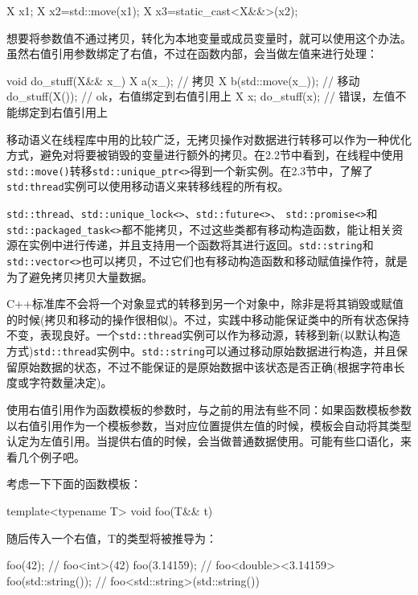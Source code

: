 \begin{cpp}
X x1;
X x2=std::move(x1);
X x3=static_cast<X&&>(x2);
\end{cpp}

想要将参数值不通过拷贝，转化为本地变量或成员变量时，就可以使用这个办法。虽然右值引用参数绑定了右值，不过在函数内部，会当做左值来进行处理：

\begin{cpp}
void do_stuff(X&& x_)
{
  X a(x_);  // 拷贝
  X b(std::move(x_));  // 移动
}
do_stuff(X());  // ok，右值绑定到右值引用上
X x;
do_stuff(x);  // 错误，左值不能绑定到右值引用上
\end{cpp}

移动语义在线程库中用的比较广泛，无拷贝操作对数据进行转移可以作为一种优化方式，避免对将要被销毁的变量进行额外的拷贝。在2.2节中看到，在线程中使用\texttt{std::move()}转移\texttt{std::unique\_ptr<>}得到一个新实例。在2.3节中，了解了\texttt{std:thread}实例可以使用移动语义来转移线程的所有权。

\texttt{std::thread}、\texttt{std::unique\_lock<>}、\texttt{std::future<>}、 \texttt{std::promise<>}和\texttt{std::packaged\_task<>}都不能拷贝，不过这些类都有移动构造函数，能让相关资源在实例中进行传递，并且支持用一个函数将其进行返回。\texttt{std::string}和\texttt{std::vector<>}也可以拷贝，不过它们也有移动构造函数和移动赋值操作符，就是为了避免拷贝拷贝大量数据。

C++标准库不会将一个对象显式的转移到另一个对象中，除非是将其销毁或赋值的时候(拷贝和移动的操作很相似)。不过，实践中移动能保证类中的所有状态保持不变，表现良好。一个\texttt{std::thread}实例可以作为移动源，转移到新(以默认构造方式)\texttt{std::thread}实例中。\texttt{std::string}可以通过移动原始数据进行构造，并且保留原始数据的状态，不过不能保证的是原始数据中该状态是否正确(根据字符串长度或字符数量决定)。


使用右值引用作为函数模板的参数时，与之前的用法有些不同：如果函数模板参数以右值引用作为一个模板参数，当对应位置提供左值的时候，模板会自动将其类型认定为左值引用。当提供右值的时候，会当做普通数据使用。可能有些口语化，来看几个例子吧。

考虑一下下面的函数模板：

\begin{cpp}
template<typename T>
void foo(T&& t)
{}
\end{cpp}

随后传入一个右值，T的类型将被推导为：

\begin{cpp}
foo(42);  // foo<int>(42)
foo(3.14159);  // foo<double><3.14159>
foo(std::string());  // foo<std::string>(std::string())
\end{cpp}

